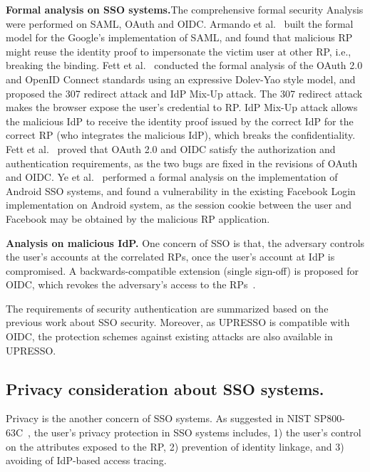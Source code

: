 \noindent\textbf{Formal analysis on SSO systems.}The comprehensive formal security Analysis were performed on SAML, OAuth and OIDC. Armando et al.~\cite{ArmandoCCCT08} built the formal model for the Google's implementation of SAML,
and found that  malicious RP might reuse the identity proof to impersonate the victim user at other RP, i.e., breaking the binding.
Fett et al.~\cite{FettKS16, FettKS17} conducted the formal analysis of the OAuth 2.0 and OpenID Connect standards using an expressive Dolev-Yao style model,
and proposed the 307 redirect attack and IdP Mix-Up attack.
The 307 redirect attack makes the browser expose the user's  credential to RP.
IdP Mix-Up attack allows the malicious IdP to receive the identity proof issued by the correct IdP for the correct RP (who integrates the malicious IdP), which breaks the confidentiality.
Fett et al.~\cite{FettKS16, FettKS17} proved that OAuth 2.0 and OIDC  satisfy the authorization and authentication requirements, as the two bugs are fixed in the revisions of OAuth and OIDC.
Ye et al.~\cite{YeBWD15} performed a formal analysis on the implementation of Android SSO systems,
 and found a vulnerability in the existing Facebook Login implementation on Android system, as the session cookie between the user and Facebook may be obtained by the malicious RP application.

\noindent\textbf{Analysis on malicious IdP.} One concern of SSO is that, the adversary  controls the user's accounts at the correlated RPs, once the user's account at IdP is compromised. A backwards-compatible extension (single sign-off) is proposed for OIDC, which revokes the adversary's access to the RPs~\cite{GhasemisharifRC18}.

The requirements of security authentication are summarized based on the previous work about SSO security. Moreover, as UPRESSO is compatible with OIDC, the protection schemes against existing attacks are also available in UPRESSO.



\subsection{Privacy consideration about SSO systems.} 
Privacy is the another concern of  SSO systems.
As suggested in NIST SP800-63C~\cite{NIST2017draft}, the user's privacy protection in SSO systems includes, 1) the user's control on the attributes exposed to the RP, 2) prevention of identity linkage, and 3) avoiding of IdP-based access tracing.

